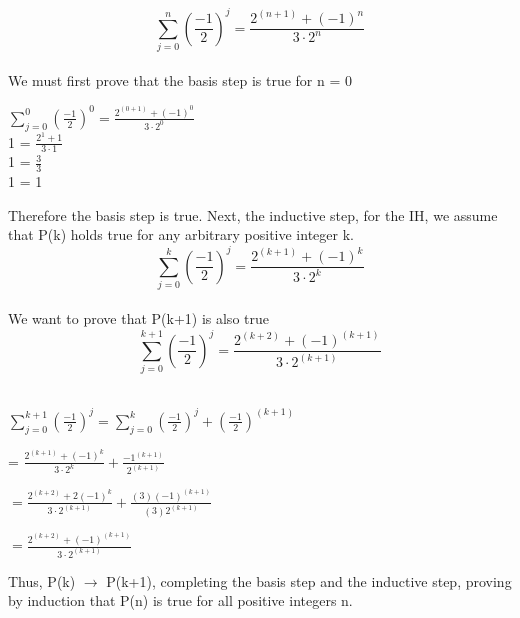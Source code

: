 \documentclass{article}
\begin{document}
\begin{equation}
\sum_{j=0}^{n} (\frac{-1}{2})^j = \frac {2^{(n+1)}+ (-1)^n}{3 \cdot 2^n} 
\end{equation} \\ 
We must first prove that the basis step is true for n = 0\\
\begin{center}
{\Large $\sum_{j=0}^{0} (\frac{-1}{2})^0 = \frac {2^{(0+1)}+ (-1)^0}{3 \cdot 2^0}$ } \\

{ 1 = $\frac{2^1 + 1} {3 \cdot 1}$} \\
{ 1 = $\frac{3} {3}$}\\
{ 1 = 1} \\
\end{center}
Therefore the basis step is true.
Next, the inductive step, for the IH, we assume that P(k) holds true for any arbitrary positive integer k. 
\begin{equation}
\sum_{j=0}^{k} (\frac{-1}{2})^j = \frac {2^{(k+1)}+ (-1)^k}{3 \cdot 2^k} 
\end{equation} \\
We want to prove that P(k+1) is also true \\ 
\begin{equation}
\sum_{j=0}^{k+1} (\frac{-1}{2})^j = \frac {2^{(k+2)}+ (-1)^{(k+1)}}{3 \cdot 2^{(k+1)}} 
\end{equation} \\  
\begin{center}
{\Large $\sum_{j=0}^{k+1} (\frac{-1}{2})^j = \sum_{j= 0}^{k} (\frac{-1}{2})^j + (\frac{-1}{2})^{(k+1)}$ } 
\end{center}
\begin{center}
{\Large = $\frac {2^{(k+1)}+ (-1)^k}{3 \cdot 2^k} + \frac {-1^{(k+1)}}{2^{(k+1)}}$}
\end{center}
\begin{center}
{\Large $= \frac {2^{(k+2)}+ 2(-1)^k}{3 \cdot 2^{(k+1)}} + \frac {(3)(-1)^{(k+1)}}{(3)2^{(k+1)}}$}
\end{center}
\begin{center}
{\Large $= \frac {2^{(k+2)}+ (-1)^{(k+1)}}{3 \cdot 2^{(k+1)}}$}
\end{center}
Thus, P(k) $\rightarrow$ P(k+1), completing the basis step and the inductive step, proving by induction that P(n) is true for all positive integers n. 
\newpage 
\end{document}

